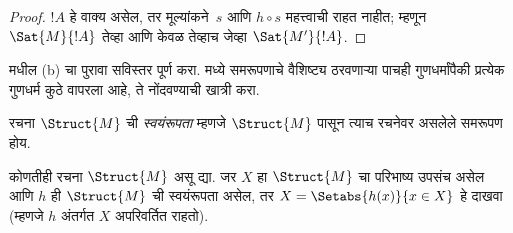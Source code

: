 \documentclass[../../../include/open-logic-section]{subfiles}
\begin{document}
\begin{proof}
$!A$ हे वाक्य असेल, तर मूल्यांकने~$s$ आणि $h \circ s$ महत्त्वाची राहत
नाहीत; म्हणून $\Sat{M}{!A}$ तेव्हा आणि केवळ तेव्हाच जेव्हा
$\Sat{M'}{!A}$.
\end{proof}

\begin{prob}
 मधील (b) चा पुरावा सविस्तर पूर्ण करा.
 मध्ये समरूपणाचे वैशिष्ट्य ठरवणाऱ्या
पाचही गुणधर्मांपैकी प्रत्येक गुणधर्म कुठे वापरला आहे, ते नोंदवण्याची
खात्री करा.
\end{prob}

\begin{defn}
रचना $\Struct{M}$ ची \emph{स्वयंरूपता} म्हणजे $\Struct{M}$ पासून
त्याच रचनेवर असलेले समरूपण होय.
\end{defn}

\begin{prob}
कोणतीही रचना $\Struct{M}$ असू द्या. जर $X$ हा $\Struct{M}$ चा परिभाष्य
उपसंच असेल आणि $h$ ही $\Struct{M}$ ची स्वयंरूपता असेल, तर $X
= \Setabs{h(x)}{x \in X}$ हे दाखवा (म्हणजे $h$ अंतर्गत $X$ अपरिवर्तित
राहतो).
\end{prob}
\end{document}
